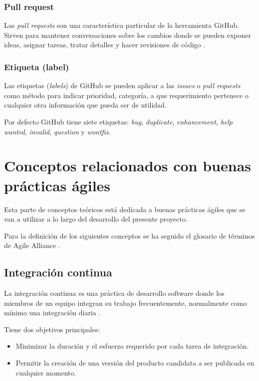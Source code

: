 \subsubsection{Pull request}

Las \textit{pull requests} son una característica particular de la herramienta GitHub. Sirven para mantener conversaciones sobre los cambios donde se pueden exponer ideas, asignar tareas, tratar detalles y hacer revisiones de código \cite{github:features}.

\subsubsection{Etiqueta (label)}

Las etiquetas (\textit{labels}) de GitHub se pueden aplicar a las \textit{issues} o \textit{pull requests} como método para indicar prioridad, categoría, a que requerimiento pertenece o cualquier otra información que pueda ser de utilidad.

Por defecto GitHub tiene siete etiquetas: \textit{bug}, \textit{duplicate}, \textit{enhancement}, \textit{help wanted}, \textit{invalid}, \textit{question} y \textit{wontfix}.

\section{Conceptos relacionados con buenas prácticas ágiles}

Esta parte de conceptos teóricos está dedicada a buenas prácticas ágiles que se van a utilizar a lo largo del desarrollo del presente proyecto.

Para la definición de los siguientes conceptos se ha seguido el glosario de términos de Agile Alliance \cite{agilealliance:glossary}.

\subsection{Integración continua}

La integración continua es una práctica de desarrollo software donde los miembros de un equipo integran su trabajo frecuentemente, normalmente como mínimo una integración diaria \cite{fowler2006continuous}.

Tiene dos objetivos principales:

\begin{itemize}
	\item Minimizar la duración y el esfuerzo requerido por cada tarea de integración.
	\item Permitir la creación de una versión del producto candidata a ser publicada en cualquier momento.
\end{itemize}


